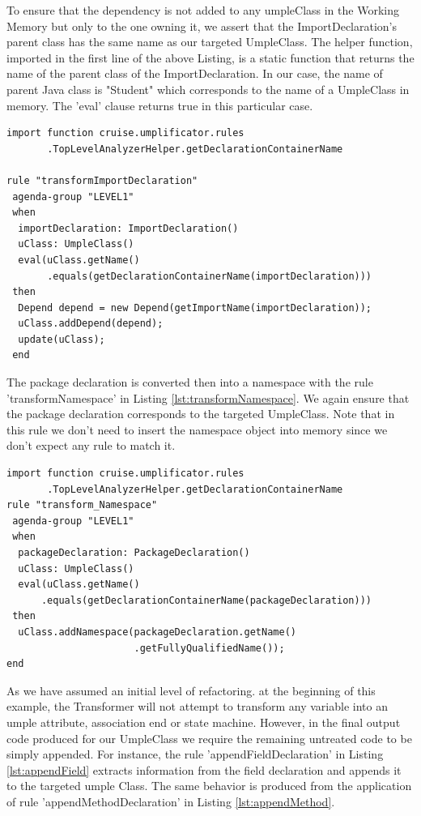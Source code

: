 To ensure that the dependency is not added to any umpleClass in the Working Memory but only to the one owning it, we assert that the ImportDeclaration's parent class has the same name as our targeted UmpleClass. The helper function, imported in the first line of the above Listing, is a static function that returns the name of the parent class of the ImportDeclaration. In our case, the name of parent Java class is "Student" which corresponds to the name of a UmpleClass in memory. The 'eval' clause returns true in this particular case.

\begin{lstlisting}[language={drools},label={lst:ruleImport}, caption=Rule transformImportDeclaration]
import function cruise.umplificator.rules
       .TopLevelAnalyzerHelper.getDeclarationContainerName
      
rule "transformImportDeclaration"
 agenda-group "LEVEL1" 
 when
  importDeclaration: ImportDeclaration()
  uClass: UmpleClass()
  eval(uClass.getName()
       .equals(getDeclarationContainerName(importDeclaration)))		
 then
  Depend depend = new Depend(getImportName(importDeclaration));
  uClass.addDepend(depend);
  update(uClass);
 end
\end{lstlisting}

The package declaration is converted then into a namespace with the rule 'transformNamespace' in Listing \ref{lst:transformNamespace}. We again ensure that the package declaration corresponds to the targeted UmpleClass. Note that in this rule we don't need to insert the namespace object into memory since we don't expect any rule to match it.

\begin{lstlisting}[language={drools},label={lst:transformNamespace}, caption=Rule transformNamespace]
import function cruise.umplificator.rules
       .TopLevelAnalyzerHelper.getDeclarationContainerName
rule "transform_Namespace"
 agenda-group "LEVEL1" 
 when
  packageDeclaration: PackageDeclaration()
  uClass: UmpleClass()
  eval(uClass.getName()
      .equals(getDeclarationContainerName(packageDeclaration)))	
 then
  uClass.addNamespace(packageDeclaration.getName()
                      .getFullyQualifiedName());
end
\end{lstlisting}

As we have assumed an initial level of refactoring. at the beginning of this example, the Transformer will not attempt to transform any variable into an umple attribute, association end or state machine. However, in the final output code produced for our UmpleClass we require the remaining untreated code to be simply appended. For instance, the rule 'appendFieldDeclaration' in Listing \ref{lst:appendField} extracts information from the field declaration and appends it to the targeted umple Class. The same behavior is produced from the application of rule 'appendMethodDeclaration' in Listing \ref{lst:appendMethod}.

